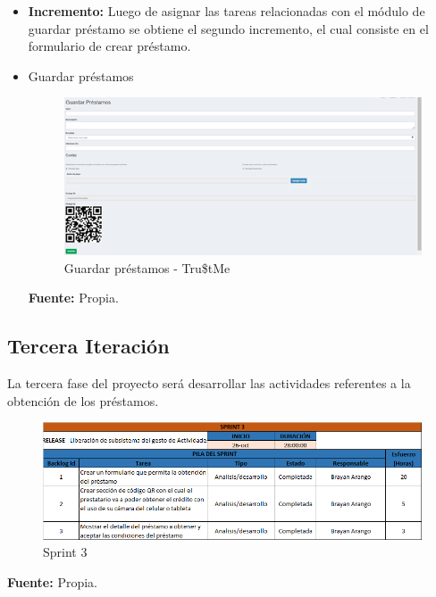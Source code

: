 {{			\begin{itemize}
				
				\item \textbf{Incremento:} Luego de asignar las tareas relacionadas con el módulo de guardar préstamo se obtiene el segundo incremento, el cual consiste en el formulario de crear préstamo.
				
				
				\item Guardar préstamos
				\begin{figure}[H]
					\centering
					\includegraphics[width=1\linewidth]{development/guardarprestamos.png}
					\caption{Guardar préstamos - Tru\$tMe}
				\end{figure}
				\begin{center}
					\textbf{Fuente:} Propia.
				\end{center}		
					
			\end{itemize}
			
			
			
		}

		\subsection{Tercera Iteración}
		{La tercera fase del proyecto será desarrollar las actividades referentes a la obtención de los préstamos.\\
			
			\begin{figure}[H]
				\centering
				\includegraphics[width=1\linewidth]{development/sprint3.png}
				\caption{Sprint 3}
			\end{figure}
			\begin{center}
				\textbf{Fuente:} Propia.
			\end{center}
				
}}
